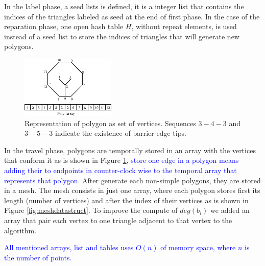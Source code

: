 In the label phase, a seed lists is defined, it is a integer list that contains the indices of the triangles labeled as seed at the end of first phase. In the case of the reparation phase, one open hash table $H$, without repeat elements, is used instead of a seed list to store the indices of triangles that will generate new polygons.

\begin{figure}
\centering     %
\includegraphics[width=0.4\textwidth]{polyarray.eps} 
\caption{Representation of polygon as set of vertices. Sequences $3 - 4 - 3$ and $3 - 5 - 3$ indicate the existence of barrier-edge tips.}%
\label{fig:a_data_poly} 
\end{figure}



In the travel phase, polygons are temporally stored in an array with the vertices that conform it as is shown in Figure \ref{fig:a_data_poly}, \textcolor{blue}{ store one edge in a polygon means adding their to endpoints in counter-clock wise to the temporal array that represents that polygon}. After generate each non-simple polygons, they are stored in a mesh. The mesh consists in just one array, where each polygon stores first its length (number of vertices) and after the index of their vertices as is shown in Figure \ref{fig:meshdatastruct}. To improve the compute of $deg(b_i)$ we added an array that pair each vertex to one triangle adjacent to that vertex to the algorithm.

\textcolor{blue}{All mentioned arrays, list and tables uses $O(n)$ of memory space, where $n$ is the number of points.}

